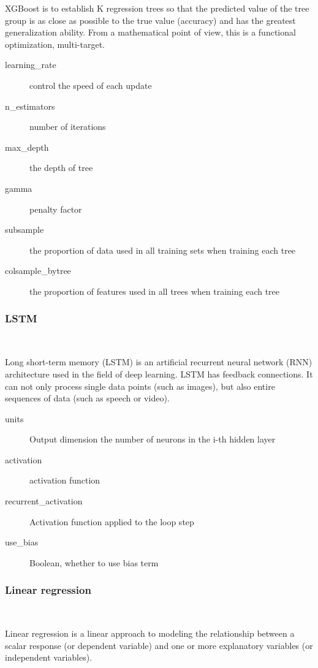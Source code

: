 XGBoost is to establish K regression trees 
so that the predicted value of 
the tree group is as close as possible to 
the true value (accuracy) and 
has the greatest generalization ability. 
From a mathematical point of view, 
this is a functional optimization, multi-target.

\begin{description}
	\item[learning_rate]  control the speed of each update
	\item[n_estimators] number of iterations
	\item[max_depth] the depth of tree
	\item[gamma] penalty factor%
	\item[subsample] the proportion of data used in 
		all training sets when training each tree
	\item[colsample_bytree] the proportion of features used 
		in all trees when training each tree
	\end{description}

\subsubsection{LSTM}
\

Long short-term memory (LSTM) is an artificial 
recurrent neural network (RNN) 
architecture used in the field of 
deep learning. LSTM has feedback connections. 
It can not only process single data 
points (such as images), but also entire 
sequences of data (such as speech or video). 
	
	
\begin{description}
	\item[units] Output dimension 
		the number of neurons in the i-th hidden layer
	\item[activation] activation function
	\item[recurrent_activation] Activation function applied to the loop step
	\item[use_bias] Boolean, whether to use bias term
\end{description}

\subsubsection{Linear regression}
\

Linear regression is a linear approach to 
modeling the relationship between a scalar 
response (or dependent variable) and one 
or more explanatory variables (or 
independent variables). 


